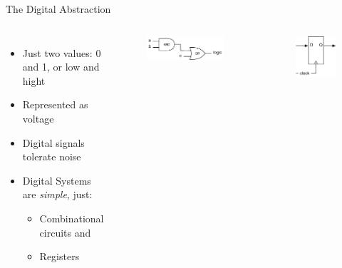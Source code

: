 \begin{frame}[fragile]{The Digital Abstraction}
\begin{columns}
 
\begin{itemize}
\item Just two values: 0 and 1, or low and hight
\item Represented as voltage
\item Digital signals tolerate noise
\item Digital Systems are \emph{simple}, just:
\begin{itemize}
\item Combinational circuits and
\item Registers
\end{itemize}
\end{itemize}
 
\begin{figure}
  \includegraphics[scale=\scale]{../figures/logic}
\end{figure}
\begin{figure}
  \includegraphics[scale=\scale]{../figures/register}
\end{figure}
\end{columns}

\end{frame}

